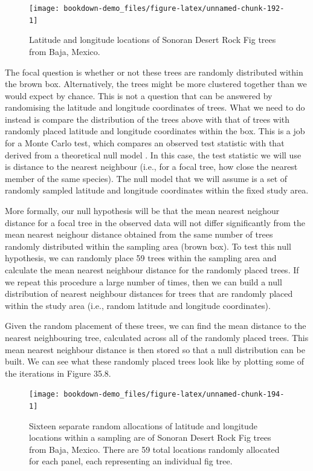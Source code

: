 \documentclass[
]{scrbook}
\begin{document}
\begin{figure}
\texttt{[image: bookdown-demo\_files/figure-latex/unnamed-chunk-192-1]} \caption{Latitude and longitude locations of Sonoran Desert Rock Fig trees from Baja, Mexico.}\label{fig:unnamed-chunk-192}
\end{figure}

The focal question is whether or not these trees are randomly distributed within the brown box.
Alternatively, the trees might be more clustered together than we would expect by chance.
This is not a question that can be answered by randomising the latitude and longitude coordinates of trees.
What we need to do instead is compare the distribution of the trees above with that of trees with randomly placed latitude and longitude coordinates within the box.
This is a job for a Monte Carlo test, which compares an observed test statistic with that derived from a theoretical null model \citep{Manly2007}.
In this case, the test statistic we will use is distance to the nearest neighbour (i.e., for a focal tree, how close the nearest member of the same species).
The null model that we will assume is a set of randomly sampled latitude and longitude coordinates within the fixed study area.

More formally, our null hypothesis will be that the mean nearest neighour distance for a focal tree in the observed data will not differ significantly from the mean nearest neighour distance obtained from the same number of trees randomly distributed within the sampling area (brown box).
To test this null hypothesis, we can randomly place 59 trees within the sampling area and calculate the mean nearest neighbour distance for the randomly placed trees.
If we repeat this procedure a large number of times, then we can build a null distribution of nearest neighbour distances for trees that are randomly placed within the study area (i.e., random latitude and longitude coordinates).

Given the random placement of these trees, we can find the mean distance to the nearest neighbouring tree, calculated across all of the randomly placed trees.
This mean nearest neighbour distance is then stored so that a null distribution can be built.
We can see what these randomly placed trees look like by plotting some of the iterations in Figure 35.8.

\begin{figure}
\texttt{[image: bookdown-demo\_files/figure-latex/unnamed-chunk-194-1]} \caption{Sixteen separate random allocations of latitude and longitude locations within a sampling  are of Sonoran Desert Rock Fig trees from Baja, Mexico. There are 59 total locations randomly allocated for each panel, each representing an individual fig tree.}\label{fig:unnamed-chunk-194}
\end{figure}
\end{document}
